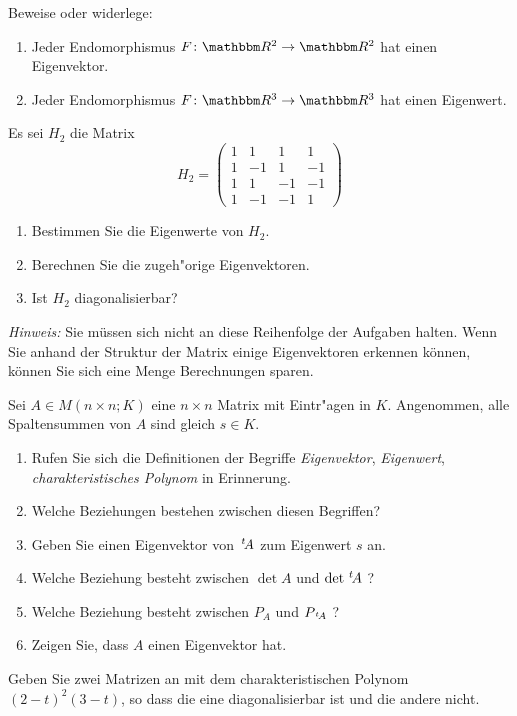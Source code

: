 \documentclass[a4,11pt]{article}
\begin{document}
\vspace*{-17mm}
{
\kopf
}


\begin{aufgabe}[4 Punkte]
  Beweise oder widerlege:
  \begin{enumerate}
  \item Jeder Endomorphismus $F \colon \R^2 \to \R^2$ hat einen
    Eigenvektor.
  \item Jeder Endomorphismus $F \colon \R^3 \to \R^3$ hat einen
    Eigenwert.
  \end{enumerate}
\end{aufgabe}

\begin{aufgabe}[Bonus]
Es sei $H_2$ die Matrix
\[
H_2 = \begin{pmatrix}
1 & 1 & 1 & 1\\
1 & -1 & 1 & -1\\
1 & 1 & -1 & -1\\
1 & -1 & -1 & 1
\end{pmatrix}
\]
\begin{enumerate}
\item Bestimmen Sie die Eigenwerte von $H_2$.
\item Berechnen Sie die zugeh"orige Eigenvektoren.
\item Ist $H_2$ diagonalisierbar?
\end{enumerate}

\emph{Hinweis:} Sie müssen sich nicht an diese Reihenfolge der
Aufgaben halten. Wenn Sie anhand der Struktur der Matrix einige
Eigenvektoren erkennen können, können Sie sich eine Menge Berechnungen
sparen.
\end{aufgabe}

\begin{aufgabe}[4 Punkte]
Sei $A \in M(n \times n ; K)$ eine $n \times n$ Matrix mit Eintr"agen in $K$.
Angenommen, alle Spaltensummen von $A$ sind gleich $s \in K$.

\begin{enumerate}
\item Rufen Sie sich die Definitionen der Begriffe \emph{Eigenvektor},
  \emph{Eigenwert}, \emph{charakteristisches Polynom} in Erinnerung.
\item Welche Beziehungen bestehen zwischen diesen Begriffen?
\item Geben Sie einen Eigenvektor von $\,^t\!A$ zum Eigenwert $s$ an.
\item Welche Beziehung besteht zwischen $\det A$ und $\det \,^t\!A$ ?
\item Welche Beziehung besteht zwischen $P_A$ und $P_{\,^t\!A}$ ?
\item Zeigen Sie, dass $A$ einen Eigenvektor hat.
\end{enumerate}

\end{aufgabe}

\begin{aufgabe}
  Geben Sie zwei Matrizen an mit dem charakteristischen Polynom
  $(2-t)^2(3-t)$, so dass die eine diagonalisierbar ist und die andere
  nicht.
\end{aufgabe}
\end{document}
